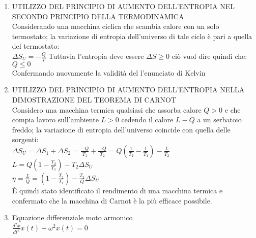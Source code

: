 \documentclass[8pt]{scrreprt}
\begin{document}
\begin{multicols*}{2}
\begin{enumerate}
\item UTILIZZO DEL PRINCIPIO DI AUMENTO DELL’ENTROPIA NEL SECONDO PRINCIPIO DELLA TERMODINAMICA \\
Considerando una macchina ciclica che scambia calore con un solo termostato; la variazione di entropia dell’universo di tale ciclo è pari a quella del termostato:\\
$\Delta S_U = -\frac{Q}{T}$
Tuttavia l’entropia deve essere $\Delta S \geq 0$ ciò vuol dire quindi che:\\
$Q\leq0$\\
Confermando nuovamente la validità del l’enunciato di Kelvin 

\item UTILIZZO DEL PRINCIPIO DI AUMENTO DELL’ENTROPIA NELLA DIMOSTRAZIONE DEL TEOREMA DI CARNOT\\
Considero una macchina termica qualsiasi che assorba calore $Q>0$ e che compia lavoro sull’ambiente $L > 0$ cedendo il calore $L-Q$ a un serbatoio freddo; la variazione di entropia dell’universo coincide con quella delle sorgenti:\\
$\Delta S_U = \Delta S_1 + \Delta S_2 = \frac{-Q}{T_1} + \frac{-Q}{T_2} = Q \left(\frac{1}{T_2} - \frac{1}{T_1}\right) - \frac{L}{T_2}$\\
$L = Q (1 - \frac{T_2}{T_1}) - T_2 \Delta S_U$\\
$\eta = \frac{L}{Q} = \left(1 - \frac{T_2}{T_1}\right) - \frac{T_2}{Q} \Delta S_U$\\
È quindi stato identificato il rendimento di una macchina termica e confermato che la macchina di Carnot è la più efficace possibile.\\

\item Equazione differenziale moto armonico\\
$\frac{d^2x}{dt^2} x(t) + \omega^2 x(t) = 0$

\end{enumerate}
\end{multicols*}
\end{document}

